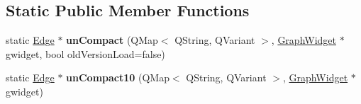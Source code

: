 \subsection*{Static Public Member Functions}
\begin{DoxyCompactItemize}
\item 
\mbox{\label{class_edge_a5ce30b8f7ceb84c9f263c2051874810e}} 
static \hyperlink{class_edge}{Edge} $\ast$ {\bfseries un\+Compact} (Q\+Map$<$ Q\+String, Q\+Variant $>$, \hyperlink{class_graph_widget}{Graph\+Widget} $\ast$gwidget, bool old\+Version\+Load=false)
\item 
\mbox{\label{class_edge_a83867363d9699e9d6d95ae08fa4efc1e}} 
static \hyperlink{class_edge}{Edge} $\ast$ {\bfseries un\+Compact10} (Q\+Map$<$ Q\+String, Q\+Variant $>$, \hyperlink{class_graph_widget}{Graph\+Widget} $\ast$gwidget)
\end{DoxyCompactItemize}
